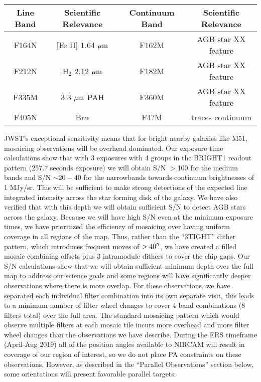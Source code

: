 \documentclass[12pt]{article}
\begin{document}
\begin{table}[htdp]
\begin{center}
\begin{tabular}{c|c|c|c}
Line Band & Scientific Relevance & Continuum Band & Scientific Relevance \\
\hline
F164N & [Fe II] 1.64 $\hbox{$\mu$m}$ & F162M & AGB star XX feature \\
F212N & H$_2$ 2.12 $\hbox{$\mu$m}$ & F182M & AGB star XX feature \\
F335M & 3.3 $\hbox{$\mu$m}$ PAH & F360M &AGB star XX feature \\
F405N & Br$\alpha$ & F4?M & traces continuum \\
\hline
\end{tabular}
\end{center}
\label{default}
\end{table}%

JWST's exceptional sensitivity means that for bright nearby galaxies like M51, mosaicing observations will be overhead dominated.  Our exposure time calculations show that with 3 exposures with 4 groups in the BRIGHT1 readout pattern (257.7 seconds exposure) we will obtain S/N $>$100 for the medium bands and S/N $\sim 20-40$ for the narrowbands towards continuum brightnesses of 1 MJy/sr.  This will be sufficient to make strong detections of the expected line integrated intensity across the star forming disk of the galaxy.  We have also verified that with this depth we will obtain sufficient S/N to detect AGB stars across the galaxy. Because we will have high S/N even at the minimum exposure times, we have prioritized the efficiency of mosaicing over having uniform coverage in all regions of the map.  Thus, rather than the ``3TIGHT'' dither pattern, which introduces frequent moves of $>40\hbox{$^{\prime\prime}$}$, we have created a filled mosaic combining offsets plus 3 intramodule dithers to cover the chip gaps.  Our S/N calculations show that we will obtain sufficient minimum depth over the full map to address our science goals and some regions will have significantly deeper observations where there is more overlap.  For these observations, we have separated each individual filter combination into its own separate visit, this leads to a minimum number of filter wheel changes to cover 4 band combinations (8 filters total) over the full area.  The standard mosaicing pattern which would observe multiple filters at each mosaic tile incurs more overhead and more filter wheel changes than the observations we have describe.  During the ERS timeframe (April-Aug 2019) all of the position angles available to NIRCAM will result in coverage of our region of interest, so we do not place PA constraints on these observations. However, as described in the ``Parallel Observations'' section below, some orientations will present favorable parallel targets.
\end{document}
